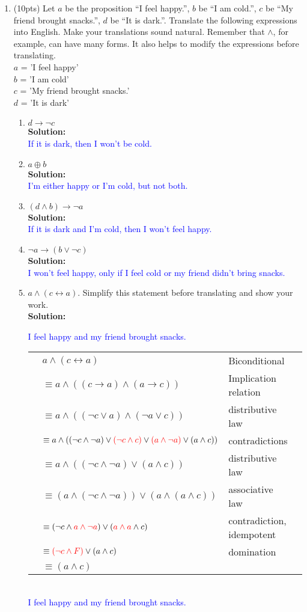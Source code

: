 \documentclass{article}
\renewcommand{\implies}{\rightarrow}
\newcommand{\xor}{\oplus}
\newcommand{\sol}[1]{\textbf{Solution:\,}\textcolor{blue}{#1}}
\begin{document}
\begin{enumerate}
\newpage

\item(10pts) Let $a$ be the proposition ``I feel happy.'', $b$ be ``I am cold.'', $c$ be ``My friend brought snacks.'', $d$ be ``It is dark.''.
Translate the following expressions into English. Make your translations sound natural. Remember that $\land$, for example, can have many forms. It also helps to modify the expressions before translating.
\\$a$ = 'I feel happy'
\\$b$ = 'I am cold'
\\$c$ = 'My friend brought snacks.'
\\$d$ = 'It is dark'
\begin{enumerate}
\item $d \implies \neg c$
\\\sol{\\If it is dark, then I won't be cold.}
\item $a \xor b$
\\\sol{\\I'm either happy or I'm cold, but not both.}
\item $(d \land b )\implies \neg a$
\\\sol{\\If it is dark and I'm cold, then I won't feel happy.}
\item $\neg a \implies (b \lor \neg c)$
\\\sol{\\I won't feel happy, only if I feel cold or my friend didn't bring snacks.}
\item $a  \land (c \leftrightarrow a)$. Simplify this statement before translating and show your work.
\\\sol{I feel happy and my friend brought snacks.
\\\begin{tabular}{llll}
&\quad $a\land (c \leftrightarrow a)$&Biconditional\\
&$\equiv a \land ((c \implies a) \land (a \implies c))$&Implication relation\\
&$\equiv a \land ((\neg c \lor a) \land (\neg a \lor c))$ &distributive law\\
&$\equiv a \land ((\neg c \land \neg a) \lor \textcolor{red}{ (\neg c \land c)} \lor\textcolor{red}{ (a \land \neg a)}\lor (a \land c))$ & contradictions\\
&$\equiv a \land ((\neg c \land \neg a) \lor (a \land c))$ & distributive law\\
&$\equiv (a \land(\neg c \land \neg a)) \lor(a \land (a \land c))$ & associative law\\
&$\equiv (\neg c \land \textcolor{red}{a \land \neg a} ) \lor(\textcolor{red}{a \land a} \land c)$& contradiction, idempotent\\
&$\equiv \textcolor{red}{(\neg c \land F)} \lor(a \land c)$ & domination\\
&$\equiv (a \land c)$\\
\end{tabular}
\\I feel happy and my friend brought snacks.}
\end{enumerate}


\end{enumerate}
\end{document}
